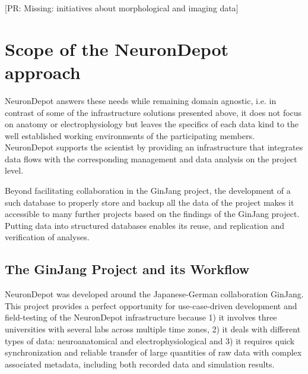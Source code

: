 \documentclass{frontiersSCNS} %
\newcommand{\pr}[1]{[\textcolor{YellowOrange}{PR: #1}]}
\begin{document}
\pr{Missing: initiatives about morphological and imaging data}


\section{Scope of the NeuronDepot approach}

NeuronDepot answers these needs while remaining domain agnostic, i.e. in
contrast of some of the infrastructure solutions presented above, it
does not focus on anatomy or electrophysiology but leaves the specifics of each
data kind to the well established working environments of the participating
members. NeuronDepot supports the scientist by providing an infrastructure that
integrates data flows with the corresponding management and data analysis on
the project level.

Beyond facilitating collaboration in the GinJang project,  the development of a
such database to properly store and backup all the data of the project makes it
accessible to many further projects based on the findings of the GinJang
project. Putting data into structured databases enables its reuse, and
replication and verification of analyses.

\subsection{The GinJang Project and its Workflow}

NeuronDepot was developed around the Japanese-German collaboration GinJang.
This project provides a perfect opportunity for use-case-driven development and
field-testing of the NeuronDepot infrastructure because 1) it involves three
universities with several labs across multiple time zones, 2) it deals with
different types of data: neuroanatomical and electrophysiological and 3) it
requires quick synchronization and reliable transfer of large quantities of raw
data with complex associated metadata, including both recorded data and
simulation results.
\end{document}
